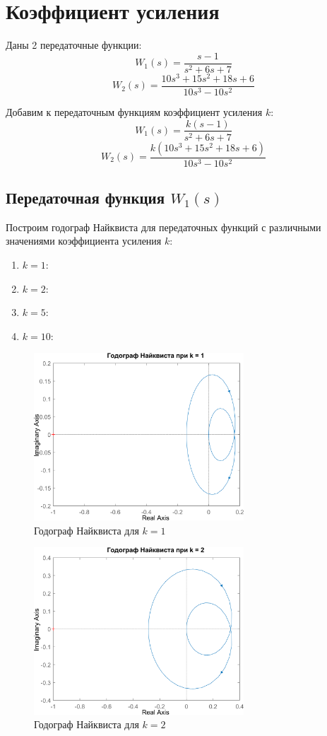 \chapter{Коэффициент усиления}
Даны 2 передаточные функции:
\[
W_1(s) = \frac{s-1}{s^2 + 6s + 7}
\]
\[
W_2(s) = \frac{10s^3 + 15s^2 + 18s + 6}{10s^3 -10s^2}
\]

Добавим к передаточным функциям коэффициент усиления $k$:
\[
W_1(s) = \frac{k(s-1)}{s^2 + 6s + 7}
\]
\[
W_2(s) = \frac{k(10s^3 + 15s^2 + 18s + 6)}{10s^3 -10s^2}
\]

\section{Передаточная функция $W_1(s)$}
Построим годограф Найквиста для передаточных функций с различными значениями коэффициента усиления $k$:
\begin{enumerate}
    \item $k = 1$:
    \item $k = 2$:
    \item $k = 5$:
    \item $k = 10$:
\end{enumerate}

\begin{figure}[H]
    \centering
    \centering
    \includegraphics[width=0.7\textwidth, trim={0cm 0cm 0cm 0cm}]{../images/2_1_0_hod.png}
    \caption{Годограф Найквиста для $k = 1$}
\end{figure}

\begin{figure}[H]
    \centering
    \centering
    \includegraphics[width=0.7\textwidth, trim={0cm 0cm 0cm 0cm}]{../images/2_1_1_hod.png}
    \caption{Годограф Найквиста для $k = 2$}
\end{figure}

